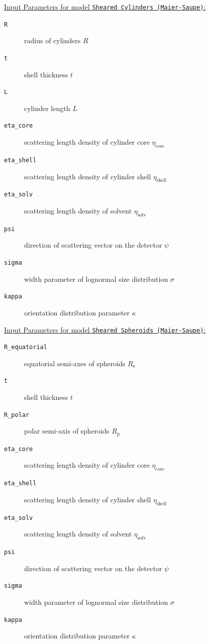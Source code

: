 \vspace{5mm}

\underline{Input Parameters for model \texttt{Sheared Cylinders (Maier-Saupe)}:}\\
\begin{description}
\item[\texttt{R}] radius of cylinders $R$
\item[\texttt{t}] shell thickness $t$
\item[\texttt{L}] cylinder length $L$
\item[\texttt{eta\_core}] scattering length density of cylinder core $\eta_\mathrm{core}$
\item[\texttt{eta\_shell}] scattering length density of cylinder shell $\eta_\mathrm{shell}$
\item[\texttt{eta\_solv}] scattering length density of solvent $\eta_\mathrm{solv}$
\item[\texttt{psi}] direction of scattering vector on the detector $\psi$
\item[{\texttt{sigma}}] width parameter of lognormal size distribution $\sigma$
\item[{\texttt{kappa}}] orientation distribution parameter $\kappa$
\end{description}

\vspace{5mm}

\underline{Input Parameters for model \texttt{Sheared Spheroids (Maier-Saupe)}:}\\
\begin{description}
\item[\texttt{R\_equatorial}] equatorial semi-axes of spheroids $R_\mathrm{e}$
\item[\texttt{t}] shell thickness $t$
\item[\texttt{R\_polar}] polar semi-axis of spheroids $R_\mathrm{p}$
\item[\texttt{eta\_core}] scattering length density of cylinder core $\eta_\mathrm{core}$
\item[\texttt{eta\_shell}] scattering length density of cylinder shell $\eta_\mathrm{shell}$
\item[\texttt{eta\_solv}] scattering length density of solvent $\eta_\mathrm{solv}$
\item[\texttt{psi}] direction of scattering vector on the detector $\psi$
\item[{\texttt{sigma}}] width parameter of lognormal size distribution $\sigma$
\item[{\texttt{kappa}}] orientation distribution parameter $\kappa$
\end{description}

